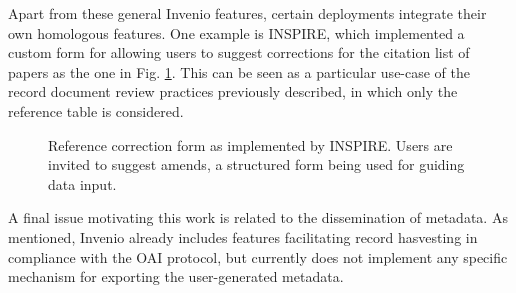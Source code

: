 Apart from these general Invenio features, certain deployments integrate their
own homologous features. One example is INSPIRE, which implemented a custom
form for allowing users to suggest corrections for the citation list of papers
as the one in Fig. \ref{fig:inspire}. This can be seen as a particular use-case
of the record document review practices previously described, in which only the
reference table is considered.

\begin{figure}[!ht]
  \centering
  \caption[Reference correction form as implemented by INSPIRE.]
          {Reference correction form as implemented by INSPIRE. Users are
           invited to suggest amends, a structured form being used for guiding
           data input.}
  \label{fig:inspire}
\end{figure}

A final issue motivating this work is related to the dissemination of metadata.
As mentioned, Invenio already includes features facilitating record hasvesting
in compliance with the OAI protocol, but currently does not implement any
specific mechanism for exporting the user-generated metadata.
